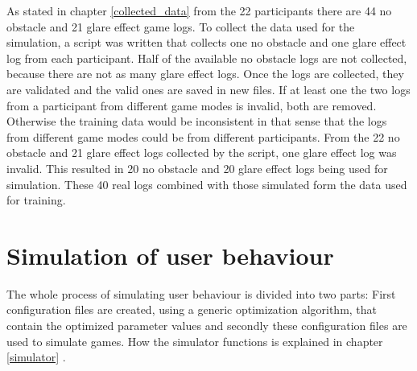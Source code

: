 As stated in chapter \ref{collected_data}  from the 22 participants there are 44 no obstacle and 21 glare effect game logs. To collect the data used for the simulation, a script was written that collects one no obstacle and one glare effect log from each participant. Half of the available no obstacle logs are not collected, because there are not as many glare effect logs. Once the logs are collected, they are validated and the valid ones are saved in new files. If at least one the two logs from a participant from different game modes is invalid, both are removed. Otherwise the training data would be inconsistent in that sense that the logs from different game modes could be from different participants. From the 22 no obstacle and 21 glare effect logs collected by the script, one glare effect log was invalid. This resulted in 20 no obstacle and 20 glare effect logs being used for simulation. These 40 real logs combined with those simulated form the data used for training. 

\section{Simulation of user behaviour}
\label{simulatoin_of_user_behaviour}
The whole process of simulating user behaviour is divided into two parts: First configuration files are created, using a generic optimization algorithm, that contain the optimized parameter values and secondly these configuration files are used to simulate games. How the simulator functions is explained in chapter \ref{simulator} .

